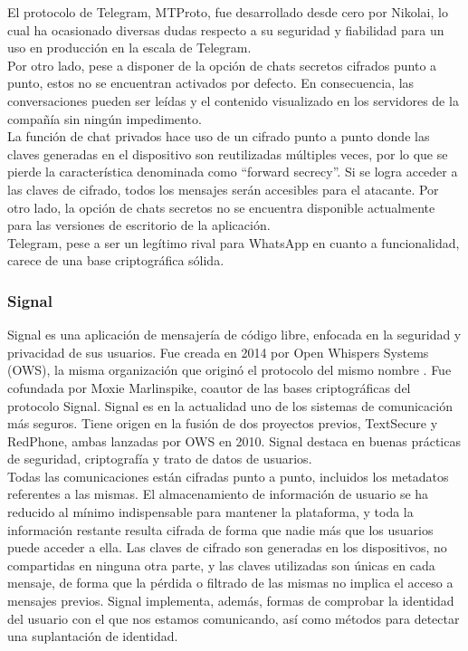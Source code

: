 El protocolo de Telegram, MTProto, fue desarrollado desde cero por Nikolai, lo cual ha ocasionado diversas dudas respecto a su seguridad y fiabilidad para un uso en producción en la escala de Telegram. \cite{TelegramCryptoChallenge} \\

Por otro lado, pese a disponer de la opción de chats secretos cifrados punto a punto, estos no se encuentran activados por defecto. En consecuencia, las conversaciones pueden ser leídas y el contenido visualizado en los servidores de la compañía sin ningún impedimento. \\

La función de chat privados hace uso de un cifrado punto a punto donde las claves generadas en el dispositivo son reutilizadas múltiples veces, por lo que se pierde la característica denominada como \hyphenquote{spanish}{forward secrecy}. Si se logra acceder a las claves de cifrado, todos los mensajes serán accesibles para el atacante. Por otro lado, la opción de chats secretos no se encuentra disponible actualmente para las versiones de escritorio de la aplicación. \\

Telegram, pese a ser un legítimo rival para WhatsApp en cuanto a funcionalidad, carece de una base criptográfica sólida. \cite{BadTelegram} \cite{StopWhatsappTelegram}

\subsubsection {Signal}

Signal es una aplicación de mensajería de código libre, enfocada en la seguridad y privacidad de sus usuarios. Fue creada en 2014 por Open Whispers Systems (OWS), la misma organización que originó el protocolo del mismo nombre \cite{WikiSignal}. Fue cofundada por Moxie Marlinspike, coautor de las bases criptográficas del protocolo Signal. Signal es en la actualidad uno de los sistemas de comunicación más seguros. Tiene origen en la fusión de dos proyectos previos, TextSecure \cite{7467371} y RedPhone, ambas lanzadas por OWS en 2010. Signal destaca en buenas prácticas de seguridad, criptografía y trato de datos de usuarios. \cite{EuroSP:CCDGS17} \cite{BlogSignal} \cite{GoodSignal01} \cite{GoodSignal02} \\

Todas las comunicaciones están cifradas punto a punto, incluidos los metadatos referentes a las mismas. El almacenamiento de información de usuario se ha reducido al mínimo indispensable para mantener la plataforma, y toda la información restante resulta cifrada de forma que nadie más que los usuarios puede acceder a ella. Las claves de cifrado son generadas en los dispositivos, no compartidas en ninguna otra parte, y las claves utilizadas son únicas en cada mensaje, de forma que la pérdida o filtrado de las mismas no implica el acceso a mensajes previos. Signal implementa, además, formas de comprobar la identidad del usuario con el que nos estamos comunicando, así como métodos para detectar una suplantación de identidad. \\

